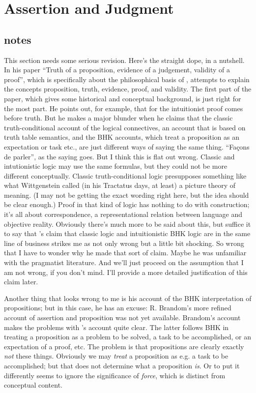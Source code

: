 \section{Assertion and Judgment}
\label{sect:assertionjudgment}

\subsection{notes}
\label{subs:notes}

This section needs some serious revision.  Here's the straight dope,
in a nutshell.  In his paper ``Truth of a proposition, evidence of a
judgement, validity of a proof''\citep{martin-lof_truth_1987}, which
is specifically about the philosophical basis of \ITT{}, \ML{}
attempts to explain the concepts proposition, truth, evidence,
proof, and validity.  The first part of the paper, which gives some
historical and conceptual background, is just right for the most
part.  He points out, for example, that for the intuitionist proof
comes before truth.  But he makes a major blunder when he claims
that the classic truth-conditional account of the logical
connectives, an account that is based on truth table semantics, and
the BHK accounts, which treat a proposition as an expectation or
task etc., are just different ways of saying the same thing.
``Façons de parler'', as the saying goes.  But I think this is flat
out wrong.  Classic and intutionistic logic may use the same
formulas, but they could not be more different conceptually.
Classic truth-conditional logic presupposes something like what
Wittgenstein called (in his Tractatus days, at least) a picture
theory of meaning. (I may not be getting the exact wording right
here, but the idea should be clear enough.)  Proof in that kind of
logic has nothing to do with construction; it's all about
correspondence, a representational relation between language and
objective reality.  Obviously there's much more to be said about
this, but suffice it to say that \ML's claim that classic logic and
intuitionistic BHK logic are in the same line of business strikes me
as not only wrong but a little bit shocking.  So wrong that I have
to wonder why he made that sort of claim.  Maybe he was unfamiliar
with the pragmatist literature.  And we'll just proceed on the
assumption that I am not wrong, if you don't mind.  I'll provide a
more detailed justification of this claim later.

Another thing that looks wrong to me is his account of the BHK
interpretation of propositions; but in this case, he has an excuse:
R. Brandom's more refined account of assertion and proposition was
not yet available.  Brandom's account makes the problems with \ML's
account quite clear.  The latter follows BHK in treating a
proposition as a problem to be solved, a task to be accomplished, or
an expectation of a proof, etc.  The problem is that propositions
are clearly exactly \emph{not} these things.  Obviously we may
\emph{treat} a proposition as e.g. a task to be accomplished; but
that does not determine what a proposition \emph{is}.  Or to put it
differently \ML{} seems to ignore the significance of \emph{force},
which is distinct from conceptual content.

